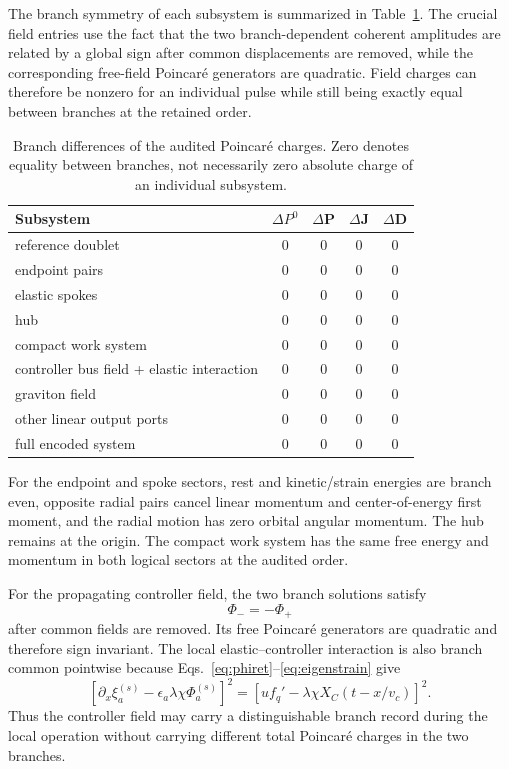 The branch symmetry of each subsystem is summarized in Table~\ref{tab:charges}. The crucial field entries use the fact that the two branch-dependent coherent amplitudes are related by a global sign after common displacements are removed, while the corresponding free-field Poincar\'e generators are quadratic. Field charges can therefore be nonzero for an individual pulse while still being exactly equal between branches at the retained order.

\begin{table}[h]
\centering
\small
\begin{tabular}{lcccc}
\toprule
Subsystem & $\Delta P^0$ & $\Delta\mathbf P$ & $\Delta\mathbf J$ & $\Delta\mathbf D$ \\
\midrule
reference doublet & 0 & 0 & 0 & 0 \\
endpoint pairs & 0 & 0 & 0 & 0 \\
elastic spokes & 0 & 0 & 0 & 0 \\
hub & 0 & 0 & 0 & 0 \\
compact work system & 0 & 0 & 0 & 0 \\
controller bus field + elastic interaction & 0 & 0 & 0 & 0 \\
graviton field & 0 & 0 & 0 & 0 \\
other linear output ports & 0 & 0 & 0 & 0 \\
\midrule
full encoded system & 0 & 0 & 0 & 0 \\
\bottomrule
\end{tabular}
\caption{Branch differences of the audited Poincar\'e charges. Zero denotes equality between branches, not necessarily zero absolute charge of an individual subsystem.}
\label{tab:charges}
\end{table}

For the endpoint and spoke sectors, rest and kinetic/strain energies are branch even, opposite radial pairs cancel linear momentum and center-of-energy first moment, and the radial motion has zero orbital angular momentum. The hub remains at the origin. The compact work system has the same free energy and momentum in both logical sectors at the audited order.

For the propagating controller field, the two branch solutions satisfy
\begin{equation}
\Phi_-=-\Phi_+
\end{equation}
after common fields are removed. Its free Poincar\'e generators are quadratic and therefore sign invariant. The local elastic--controller interaction is also branch common pointwise because Eqs.~\eqref{eq:phiret}--\eqref{eq:eigenstrain} give
\begin{equation}
\left[
\partial_x\xi_a^{(s)}-
\epsilon_a\lambda\chi\Phi_a^{(s)}
\right]^2
=
\left[u f_q'-\lambda\chi X_C(t-x/v_c)\right]^2.
\end{equation}
Thus the controller field may carry a distinguishable branch record during the local operation without carrying different total Poincar\'e charges in the two branches.

